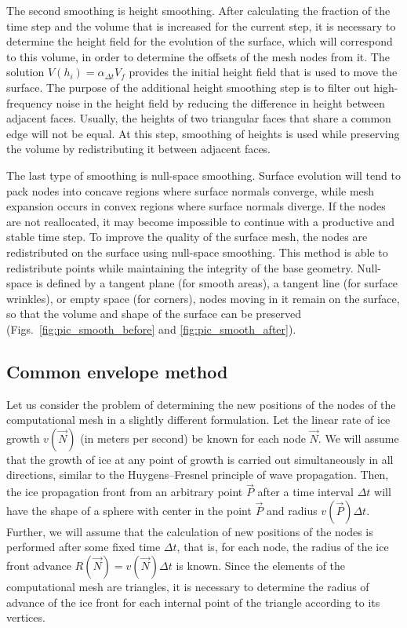 \documentclass[
11pt,
tightenlines,
twoside,
onecolumn,
nofloats,
nobibnotes,
nofootinbib,
superscriptaddress,
noshowpacs,
centertags]
{revtex4-2}
\begin{document}
The second smoothing is height smoothing.
After calculating the fraction of the time step and the volume that is increased for the current step, it is necessary to determine the height field for the evolution of the surface, which will correspond to this volume, in order to determine the offsets of the mesh nodes from it.
The solution $V(h_i) = \alpha_{\Delta t} V_f$ provides the initial height field that is used to move the surface.
The purpose of the additional height smoothing step is to filter out high-frequency noise in the height field by reducing the difference in height between adjacent faces.
Usually, the heights of two triangular faces that share a common edge will not be equal.
At this step, smoothing of heights is used while preserving the volume by redistributing it between adjacent faces.

The last type of smoothing is null-space smoothing.
Surface evolution will tend to pack nodes into concave regions where surface normals converge, while mesh expansion occurs in convex regions where surface normals diverge.
If the nodes are not reallocated, it may become impossible to continue with a productive and stable time step.
To improve the quality of the surface mesh, the nodes are redistributed on the surface using null-space smoothing.
This method is able to redistribute points while maintaining the integrity of the base geometry.
Null-space is defined by a tangent plane (for smooth areas),  a
tangent line (for surface wrinkles), or empty space (for corners),
nodes moving in it remain on the surface, so that the volume and
shape of the surface can be preserved
(Figs.~\ref{fig:pic_smooth_before} and \ref{fig:pic_smooth_after}).

\subsection{Common envelope method}
Let us consider the problem of determining the new positions of the
nodes of the computational mesh in a slightly different formulation.
Let the linear rate of ice growth $v(\vec{N})$ (in meters per
second) be  known for each node $\vec{N}$.
We will assume that the growth of ice at any point of growth  is
carried out simultaneously in all directions, similar to the
Huygens--Fresnel principle of wave propagation.
Then, the ice propagation front from an arbitrary point $\vec{P}$
after a time interval $\Delta t$ will have the shape of a sphere
with center in the point $\vec{P}$ and radius $v(\vec{P}) \Delta t$.
Further, we will assume that the calculation of new positions of the nodes is performed after some fixed time $\Delta t$, that is, for each node, the radius of the ice front advance $R(\vec{N}) = v(\vec{N}) \Delta t$ is known.
Since the elements of the computational mesh are triangles, it is
necessary to determine the radius of advance of the ice front for
each internal point of the triangle according to its vertices.
\end{document}
